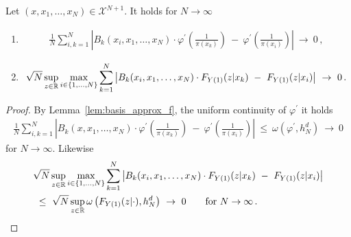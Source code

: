 \begin{lemma}
  \label{lem:basis_2}
  Let $(x,x_1,\ldots,x_N)\in\mathcal{X}^{N+1}$.
  It holds
  for $N\to\infty$
  \begin{enumerate}[label=(\roman*)]
      \item
      \begin{align*}
        \frac
        {1}
        {N}
        \sum_{i,k=1}^{N}
            \left|
        B_k(x_i,x_1,\ldots,x_N)
        \cdot
        \varphi^{'}
            \left(
              \frac
              {1}
              {\pi(x_k)}
            \right)
            \ 
            -
            \ 
            \varphi^{'}
            \left(
              \frac
              {1}
              {\pi(x_i)}
            \right)
            \right|
            \ 
            \to
            \ 
            0
            \,,
          \end{align*}
\item
      \begin{align*}
        \sqrt{N}
        \sup_{z\in\R}
        \max_{i\in \left\{ 1,\ldots,N \right\}}
        \sum_{k=1}^{N}
            \left|
        B_k(x_i,x_1,\ldots,x_N)
        \cdot
        F_{Y(1)}(z|x_k)
            \ 
            -
            \ 
        F_{Y(1)}(z|x_i)
            \right|
            \ 
            \to
            \ 
            0
            \,.
      \end{align*}
\end{enumerate}
\end{lemma}
\begin{proof}
  By Lemma~\ref{lem:basis_approx_f},
  the uniform continuity of $\varphi^{'}$
  it holds
      \begin{align*}
        \frac
        {1}
        {N}
        \sum_{i,k=1}^{N}
            \left|
        B_k(x,x_1,\ldots,x_N)
        \cdot
            \varphi^{'}
            \left(
              \frac
              {1}
              {\pi(x_k)}
            \right)
            \ 
            -
            \ 
            \varphi^{'}
            \left(
              \frac
              {1}
              {\pi(x_i)}
            \right)
            \right|
            \ 
            \le
            \ 
   \omega
   \left(
     \varphi^{'},h_N^d
   \right)
            \ 
            \to
            \ 
            0
          \end{align*}
          for $N\to\infty$.
          Likewise
\begin{align*}
  &
        \sqrt{N}
        \sup_{z\in\R}
        \max_{i\in \left\{ 1,\ldots,N \right\}}
        \sum_{k=1}^{N}
            \left|
        B_k(x_i,x_1,\ldots,x_N)
        \cdot
        F_{Y(1)}(z|x_k)
            \ 
            -
            \ 
        F_{Y(1)}(z|x_i)
          \right|
             \\
            &
            \ 
            \le
            \ 
            \sqrt{N}
            \sup_{z\in\R}
            \omega
            \left(
        F_{Y(1)}(z|\cdot)
        ,
        h_N^d
            \right)
            \ 
            \to
            \ 
            0
            \qquad
            \text{for}
            \ 
            N\to\infty
            \,.
\end{align*}
        \end{proof}
